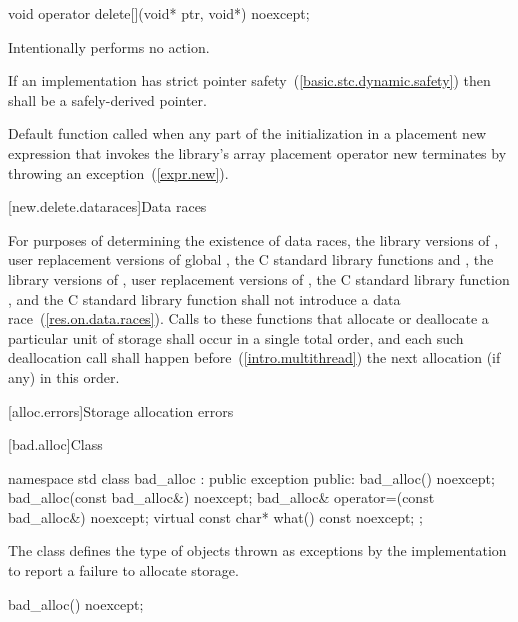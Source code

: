 %
\begin{itemdecl}
void operator delete[](void* ptr, void*) noexcept;
\end{itemdecl}

\begin{itemdescr}
\pnum
\effects
Intentionally performs no action.

\pnum
\requires
If an implementation has strict pointer safety~(\ref{basic.stc.dynamic.safety})
then  shall be a safely-derived pointer.

\pnum
\notes
Default function called when any part of the initialization in a
placement new expression that invokes the library's
array placement operator new
terminates by throwing an exception~(\ref{expr.new}).
\end{itemdescr}

[new.delete.dataraces]{Data races}

\pnum
For purposes of determining the existence of data races, the library versions
of , user replacement versions of global ,
the C standard library functions  and , the library
versions of , user replacement
versions of , the C standard library function
, and the C standard library function  shall not
introduce a data race~(\ref{res.on.data.races}).
Calls to these functions that allocate or deallocate a particular unit
of storage shall occur in a single total order, and each such deallocation call
shall happen before~(\ref{intro.multithread}) the next allocation (if any) in
this order.

[alloc.errors]{Storage allocation errors}

%
[bad.alloc]{Class }

\begin{codeblock}
namespace std {
  class bad_alloc : public exception {
  public:
    bad_alloc() noexcept;
    bad_alloc(const bad_alloc&) noexcept;
    bad_alloc& operator=(const bad_alloc&) noexcept;
    virtual const char* what() const noexcept;
  };
}
\end{codeblock}

\pnum
The class
defines the type of objects thrown as
exceptions by the implementation to report a failure to allocate storage.

%
\begin{itemdecl}
bad_alloc() noexcept;
\end{itemdecl}

